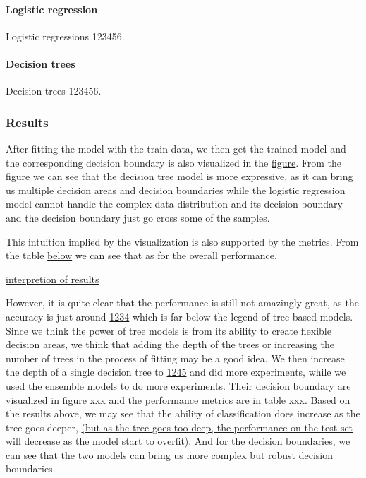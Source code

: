 \documentclass{article}
\begin{document}
\paragraph{Logistic regression} Logistic regressions 123456.

\paragraph{Decision trees} Decision trees 123456.

\subsubsection*{Results}




After fitting the model with the train data, we then get the trained model and the corresponding decision boundary is also visualized in the \underline{figure}. From the figure we can see that the decision tree model is more expressive, as it can bring us multiple decision areas and decision boundaries while the logistic regression model cannot handle the complex data distribution and its decision boundary and the decision boundary just go cross some of the samples. 


This intuition implied by the visualization is also supported by the metrics. From the table \underline{below} we can see that as for the overall performance. 

\underline{interpretion of results}


However, it is quite clear that the performance is still not amazingly great, as the accuracy is just around \underline{1234} which is far below the legend of tree based models. Since we think the power of tree models is from its ability to create flexible decision areas, we think that adding the depth of the trees or increasing the number of trees in the process of fitting may be a good idea. We then increase the depth of a single decision tree to \underline{1245} and did more experiments,
while we used the ensemble models to do more experiments. Their decision boundary are visualized in \underline{figure xxx} and the performance metrics are in \underline{table xxx}. Based on the results above, we may see that the ability of classification does increase as the tree goes deeper, 
\underline{(but as the tree goes too deep, the performance on the test set will decrease as the model start to overfit)}. 
And for the decision boundaries, we can see that the two models can bring us more complex but robust decision boundaries.
\end{document}
